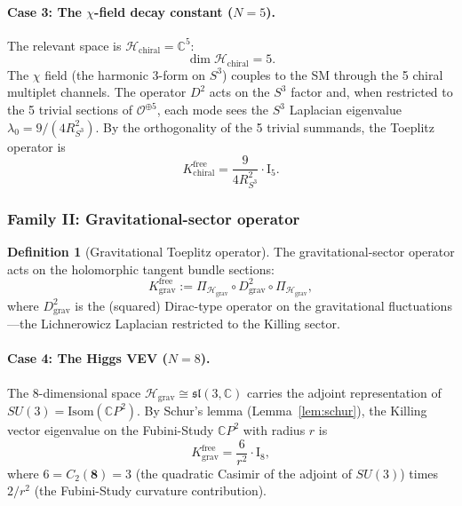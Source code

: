 \documentclass[11pt]{article}
\theoremstyle{definition}
\newtheorem{definition}[theorem]{Definition}
\theoremstyle{remark}
\newcommand{\CP}{\mathbb{C}P}
\newcommand{\Id}{\mathrm{I}}
\begin{document}
\paragraph{Case 3: The $\chi$-field decay constant ($N = 5$).}
The relevant space is $\mathcal{H}_{\mathrm{chiral}} = \mathbb{C}^5$:
\begin{equation}
\dim \mathcal{H}_{\mathrm{chiral}} = 5.
\end{equation}
The $\chi$ field (the harmonic 3-form on $S^3$) couples to the SM
through the 5 chiral multiplet channels. The operator $D^2$ acts on the
$S^3$ factor and, when restricted to the 5 trivial sections of
$\mathcal{O}^{\oplus 5}$, each mode sees the $S^3$ Laplacian
eigenvalue $\lambda_0 = 9/(4R_{S^3}^2)$. By the orthogonality of the
5 trivial summands, the Toeplitz operator is
\begin{equation}
K^{\mathrm{free}}_{\mathrm{chiral}} = \frac{9}{4 R_{S^3}^2} \cdot \Id_5.
\end{equation}

\subsubsection{Family II: Gravitational-sector operator}

\begin{definition}[Gravitational Toeplitz operator]
\label{def:grav-op}
The gravitational-sector operator acts on the holomorphic tangent
bundle sections:
\begin{equation}
K^{\mathrm{free}}_{\mathrm{grav}} := \Pi_{\mathcal{H}_{\mathrm{grav}}} \circ
D^2_{\mathrm{grav}} \circ \Pi_{\mathcal{H}_{\mathrm{grav}}},
\end{equation}
where $D^2_{\mathrm{grav}}$ is the (squared) Dirac-type operator on the
gravitational fluctuations---the Lichnerowicz Laplacian restricted to
the Killing sector.
\end{definition}

\paragraph{Case 4: The Higgs VEV ($N = 8$).}
The 8-dimensional space $\mathcal{H}_{\mathrm{grav}} \cong
\mathfrak{sl}(3,\mathbb{C})$ carries the adjoint representation of
$SU(3) = \mathrm{Isom}(\CP^2)$. By Schur's lemma
(Lemma~\ref{lem:schur}), the Killing vector eigenvalue on the
Fubini-Study $\CP^2$ with radius $r$ is
\begin{equation}
K^{\mathrm{free}}_{\mathrm{grav}} = \frac{6}{r^2} \cdot \Id_8,
\end{equation}
where $6 = C_2(\mathbf{8}) = 3$ (the quadratic Casimir of the adjoint
of $SU(3)$) times $2/r^2$ (the Fubini-Study curvature contribution).
\end{document}
